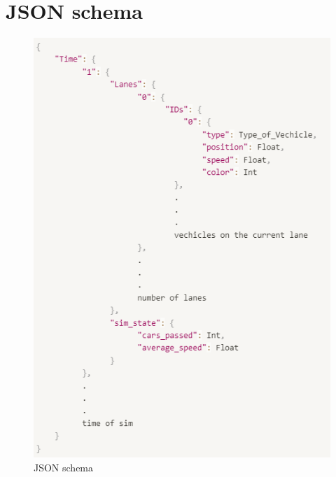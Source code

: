\section{JSON schema}
\label{appendix:json-schema}
\begin{figure}[H]
    \centering
    \includegraphics[width=0.5\linewidth]{images/json-schema.png}
    \caption{JSON schema}
    \label{fig:json-schema}
\end{figure}